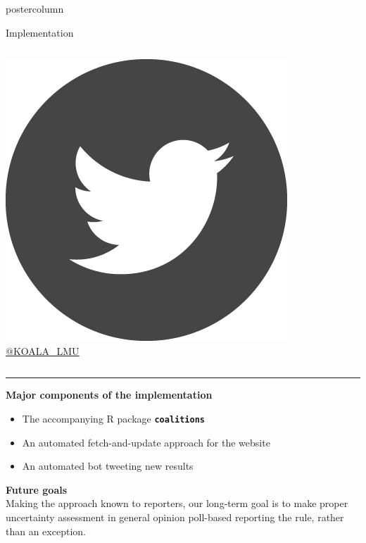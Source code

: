 \documentclass[final,hyperref={pdfpagelabels=false}]{beamer}
\let\olditem\item
\renewcommand\item{\justifying\olditem} %
\newcommand{\bfBlue}[1]{\textcolor{koaladarkestblue}{\textbf{#1}}}
\newcommand{\blue}[1]{\textcolor{koaladarkestblue}{#1}}
\newcommand*\circled[1]{\tikz[baseline=(char.base)]{
\node[shape=circle,draw,inner sep=2pt] (char) {#1};}}
\begin{document}
\begin{frame}
\begin{columns}
\begin{column}{1\textwidth}
\begin{columns}[T]
\begin{column}{.484\textwidth}
\begin{beamercolorbox}[center,wd=\textwidth]{postercolumn}
\begin{minipage}[T]{.95\textwidth}
\begin{block}{\footnotesize \circled{3} Implementation}
\begin{columns}[t]
  \begin{column}{.45\textwidth}
  \begin{center}\centering
  \includegraphics[height=3.5ex]{figures/implementation_twitter} \\
  \blue{\footnotesize \href{https://twitter.com/KOALA_LMU}{@KOALA\_LMU}}
  \end{center}
  \end{column}
\end{columns}
\vspace{1ex}
\textcolor{LMUlightgray}{\hrule{}}
\vspace{3ex}

\bfBlue{Major components of the implementation}
\begin{minipage}{\textwidth}
\hspace{0.5in}
\begin{itemize}
  \item The accompanying R package \bfBlue{\texttt{coalitions}} 
  \item An automated fetch-and-update approach for the website
  \item An automated bot tweeting new results
\end{itemize}
\vspace{5ex}
\end{minipage}

\bfBlue{Future goals} \\
Making the approach known to reporters,
our long-term goal is to make proper uncertainty assessment in general opinion
poll-based reporting the rule, rather than an exception. 


\end{block}
\end{minipage}
\end{beamercolorbox}
\end{column}
\end{columns}
\end{column}
\end{columns}
\end{frame}
\end{document}
